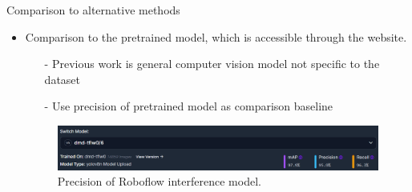 \begin{frame}{\huge{Comparison to alternative methods}}
  \begin{itemize}
    \item Comparison to the pretrained model, which is accessible through the website.
    \begin{itemize}
      \item[-] Previous work is general computer vision model not specific to the dataset
      \item[-] Use precision of pretrained model as comparison baseline 
    \end{itemize}
    \vspace{5mm}
    \begin{figure}[H]
      \centering
      \includegraphics[width=.9\textwidth]{content/prec_pret.png}
      \caption{Precision of Roboflow interference model.}
    \end{figure}
  \end{itemize}
\end{frame}

